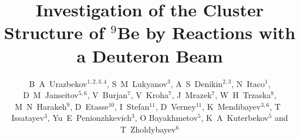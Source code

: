 \documentclass[10pt]{iopart}
\begin{document}
\title[B A Urazbekov \etal ]{Investigation of the Cluster Structure of $^9$Be by Reactions with a Deuteron Beam}

\author{B~A~Urazbekov$^{1,2,3,4}$, S~M~Lukyanov$^3$,  A~S~Denikin$^{2,3}$, N~Itaco$^1$,  D~M~Janseitov$^{5,6}$, V~Burjan$^7$, V~Kroha$^7$, J~Mrazek$^7$, W~H~Trzaska$^8$, M~N~Harakeh$^9$, D~Etasse$^{10}$, I~Stefan$^{11}$, D~Verney$^{11}$, K~Mendibayev$^{3,6}$, T~ Issatayev$^3$, Yu~E~Penionzhkevich$^{3}$,   O Bayakhmetov$^{5}$, K~A~Kuterbekov$^{5}$ and T~Zholdybayev$^{6}$}

\address{$^1$ Dipartimento di Matematica e Fisica, 
Universit\`{a} degli Studi della Campania “Luigi Vanvitelli”, I-8110 Caserta, Italy}
\address{$^2$ Dubna State University, 141982 Dubna, Russia}
\address{$^3$ Joint Institute for nuclear research,  141980 Dubna, Russia}
\address{$^4$ Al-Farabi Kazakh National University, 050040 Almaty, Kazakhstan }
\address{$^5$ L~N~Gumilyov Eurasian National University, 010008 Astana, Kazakhstan }
\address{$^6$ Institute of Nuclear Physics, 050032 Almaty, Kazakhstan}
\address{$^7$ Nuclear Physics Institute CAS, 25068 \v{R}e\v{z}, Czech Republic}
\address{$^8$ Department of Physics, University of Jyv\"askyl\"a, FIN-40014 Jyv\"askyl\"a, Finland}
\address{$^9$ KVI-CART, University of Groningen, 9747 AA Groningen, The Netherlands}
\address{$^{10}$ Normandie Universit\'{e}, ENSICAEN, UNICAEN, CNRS/IN2P3, LPC Caen, 14000 Caen, France}
\address{$^{11}$ Institut de Physique Nucl\'{e}aire, Univ. Paris-Sud, Universit\'{e} Paris-Saclay, F-91406 Orsay, France}
\end{document}
